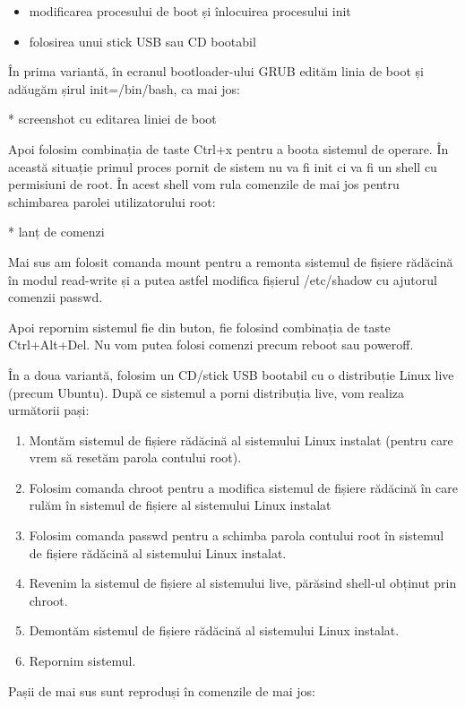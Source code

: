 \begin{itemize}
	\item modificarea procesului de boot și înlocuirea procesului init
	\item folosirea unui stick USB sau CD bootabil
\end{itemize}

În prima variantă, în ecranul bootloader-ului GRUB edităm linia de boot și
adăugăm șirul init=/bin/bash, ca mai jos:

* screenshot cu editarea liniei de boot

Apoi folosim combinația de taste Ctrl+x pentru a boota sistemul de operare. În
această situație primul proces pornit de sistem nu va fi init ci va fi un shell
cu permisiuni de root. În acest shell vom rula comenzile de mai jos pentru
schimbarea parolei utilizatorului root:

* lanț de comenzi

Mai sus am folosit comanda mount pentru a remonta sistemul de fișiere rădăcină
în modul read-write și a putea astfel modifica fișierul /etc/shadow cu ajutorul
comenzii passwd.

Apoi repornim sistemul fie din buton, fie folosind combinația de taste
Ctrl+Alt+Del. Nu vom putea folosi comenzi precum reboot sau poweroff.

În a doua variantă, folosim un CD/stick USB bootabil cu o distribuție Linux live
(precum Ubuntu). După ce sistemul a porni distribuția live, vom realiza
următorii pași:

\begin{enumerate}
	\item Montăm sistemul de fișiere rădăcină al sistemului Linux instalat
		(pentru care vrem să resetăm parola contului root).
	\item Folosim comanda chroot pentru a modifica sistemul de fișiere
		rădăcină în care rulăm în sistemul de fișiere al sistemului
		Linux instalat
	\item Folosim comanda passwd pentru a schimba parola contului root în
		sistemul de fișiere rădăcină al sistemului Linux instalat.
	\item Revenim la sistemul de fișiere al sistemului live, părăsind
		shell-ul obținut prin chroot.
	\item Demontăm sistemul de fișiere rădăcină al sistemului Linux instalat.
	\item Repornim sistemul.
\end{enumerate}

Pașii de mai sus sunt reproduși în comenzile de mai jos:

